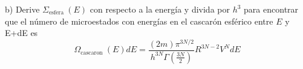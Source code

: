 b) Derive $\Sigma_{\text {esfera }}(E)$ con respecto a la energía y divida por $h^3$ para encontrar que el número de microestados con energías en el cascarón esférico entre $E$ y E+dE es
$$
\Omega_{\text {cascaron }}(E) d E=\frac{(2 m) \pi^{3 N / 2}}{h^{3 N} \Gamma\left(\frac{3 N}{2}\right)} R^{3 N-2} V^N d E
$$